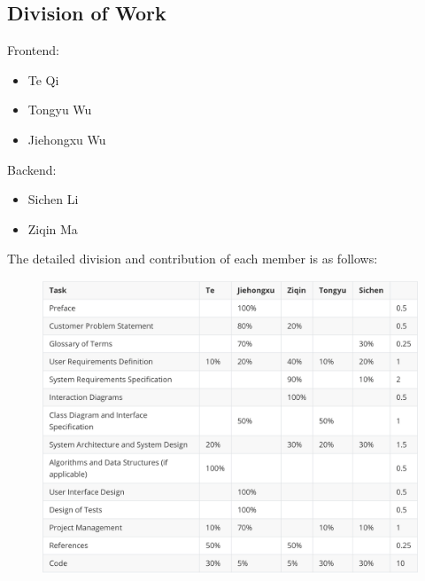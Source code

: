 \documentclass{article}
\begin{document}
\subsection{Division of Work}
Frontend: 
\begin{itemize}
  \item Te Qi
  \item Tongyu Wu
  \item Jiehongxu Wu
\end{itemize}
Backend:
\begin{itemize}
  \item Sichen Li
  \item Ziqin Ma
\end{itemize}

The detailed division and contribution of each member is as follows:
\begin{figure}[H]
  \center
  \includegraphics[scale=0.25]{diagrams/contribution.png}
\end{figure}
\end{document}
